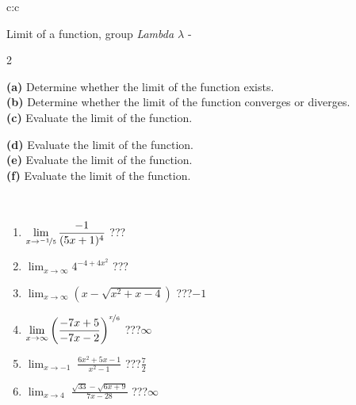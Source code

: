 \documentclass[10pt]{report}
\begin{document}
\newpage
\thispagestyle{empty}
\begin{tabular}{c:c}
\begin{minipage}[c][104.5mm][t]{0.5\linewidth}
\begin{center}
\vspace{5mm}
{\huge Limit of a function, group \textit{Lambda $\lambda$} -}\\[5mm]
\begin{minipage}{0.95\linewidth}
\begin{center}
{\small \begin{multicols}{2} \raggedright
\textbf{(a)} Determine whether the limit of the function exists. \\[1mm]
\textbf{(b)} Determine whether the limit of the function converges or diverges. \\[1mm]
\textbf{(c)} Evaluate the limit of the function. \par \columnbreak
\textbf{(d)} Evaluate the limit of the function. \\[1mm]
\textbf{(e)} Evaluate the limit of the function. \\[1mm]
\textbf{(f)} Evaluate the limit of the function. \\[1mm]
\end{multicols}
}
\end{center}
\end{minipage}
\\[1mm]
\begin{minipage}{0.79\linewidth}
\begin{center}
\begin{varwidth}{\linewidth}
\setlength{\itemsep}{0pt}
\begin{enumerate}
\normalsize
\item $\displaystyle\lim_{x\to\nicefrac{-1}{5}}{\frac{-1}{(5x+1)^{4}}}$\quad \dotfill\; ???\;\dotfill \quad {}
\item $\displaystyle\lim_{x\to\infty}{4^{-4+4x^2}}$\quad \dotfill\; ???\;\dotfill \quad {}
\item $\displaystyle\lim_{x\to\infty}{\left(x - \sqrt{x^2+x-4}\right)}$\quad \dotfill\; ???\;\dotfill \quad $-1$
\item $\displaystyle\lim_{x\to\infty}{\left( \frac{-7x+5}{-7x-2} \right)^{\nicefrac{x}{6}}}$\quad \dotfill\; ???\;\dotfill \quad $\infty$
\item $\displaystyle\lim_{x\to -1}{\;\frac{6x^2+5x-1}{x^2-1}}$\quad \dotfill\; ???\;\dotfill \quad $\frac{7}{2}$
\item $\displaystyle\lim_{x\to 4}{\;\frac{\sqrt{33}-\sqrt{6x+9}}{7x-28}}$\quad \dotfill\; ???\;\dotfill \quad $\infty$

\end{enumerate}
\end{varwidth}
\end{center}
\end{minipage}
\end{center}
\end{minipage}
\end{tabular}
\end{document}

